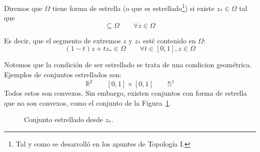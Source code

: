 \begin{definicion}
    Diremos que $\Omega$ tiene forma de estrella (o que es estrellado\footnote{Tal y como se desarrolló en los apuntes de Topología I.}) si existe $z_\ast \in \Omega$ tal que 
    \begin{equation*}
        [z,z_\ast] \subseteq  \Omega \qquad \forall z\in \Omega
    \end{equation*}

    Es decir, que el segmento de extremos $z$ y $z_\ast$ esté contenido en $\Omega$:
    \begin{equation*}
        (1-t)z + tz_\ast \in \Omega \qquad \forall t\in [0,1], z\in \Omega
    \end{equation*}
\end{definicion}

Notemos que la condición de ser estrellado se trata de una condicion geométrica. Ejemplos de conjuntos estrellados son:
\begin{equation*}
    \mathbb{R}^2 \qquad [0,1]\times [0,1] \qquad \mathbb{S}^1
\end{equation*}
Todos estos son convexos. Sin embargo, existen conjuntos con forma de estrella que no son convexos, como el conjunto de la Figura~\ref{fig:Estrellado}.
\begin{figure}[H]
    \centering
    \caption{Conjunto estrellado desde $z_\ast$.}
    \label{fig:Estrellado}
\end{figure}

